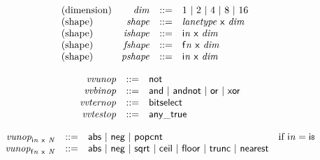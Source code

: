 \vspace{1ex}

$$
\begin{array}{@{}lrrl@{}l@{}}
\mbox{(dimension)} & {\mathit{dim}} &::=& 1 ~|~ 2 ~|~ 4 ~|~ 8 ~|~ 16 \\
\mbox{(shape)} & {\mathit{shape}} &::=& {\mathit{lanetype}}~\mathsf{x}~{\mathit{dim}} \\
\mbox{(shape)} & {\mathit{ishape}} &::=& {\mathsf{i}}{{\mathit{n}}}~\mathsf{x}~{\mathit{dim}} \\
\mbox{(shape)} & {\mathit{fshape}} &::=& {\mathsf{f}}{{\mathit{n}}}~\mathsf{x}~{\mathit{dim}} \\
\mbox{(shape)} & {\mathit{pshape}} &::=& {\mathsf{i}}{{\mathit{n}}}~\mathsf{x}~{\mathit{dim}} \\
\end{array}
$$

$$
\begin{array}{@{}lrrl@{}l@{}}
& {\mathit{vvunop}} &::=& \mathsf{not} \\
& {\mathit{vvbinop}} &::=& \mathsf{and} ~|~ \mathsf{andnot} ~|~ \mathsf{or} ~|~ \mathsf{xor} \\
& {\mathit{vvternop}} &::=& \mathsf{bitselect} \\
& {\mathit{vvtestop}} &::=& \mathsf{any\_true} \\
\end{array}
$$

$$
\begin{array}{@{}lrrl@{}l@{}}
& {{\mathit{vunop}}}_{{\mathsf{i}}{{\mathit{n}}}~\mathsf{x}~{\mathit{N}}} &::=& \mathsf{abs} ~|~ \mathsf{neg} ~|~ \mathsf{popcnt} &\quad
  \mbox{if}~{\mathsf{i}}{{\mathit{n}}} = \mathsf{i{\scriptstyle8}} \\
& {{\mathit{vunop}}}_{{\mathsf{f}}{{\mathit{n}}}~\mathsf{x}~{\mathit{N}}} &::=& \mathsf{abs} ~|~ \mathsf{neg} ~|~ \mathsf{sqrt} ~|~ \mathsf{ceil} ~|~ \mathsf{floor} ~|~ \mathsf{trunc} ~|~ \mathsf{nearest} \\
\end{array}
$$

